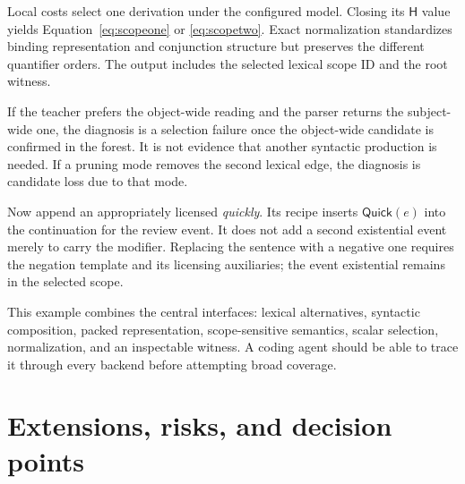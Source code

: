 \documentclass[11pt,a4paper]{article}
\newcommand{\HH}{\mathsf{H}}
\begin{document}
Local costs select one derivation under the configured model. Closing its
\(\HH\) value yields Equation~\eqref{eq:scopeone} or
\eqref{eq:scopetwo}. Exact normalization standardizes binding representation
and conjunction structure but preserves the different quantifier orders.
The output includes the selected lexical scope ID and the root witness.

If the teacher prefers the object-wide reading and the parser returns the
subject-wide one, the diagnosis is a selection failure once the object-wide
candidate is confirmed in the forest. It is not evidence that another
syntactic production is needed. If a pruning mode removes the second lexical
edge, the diagnosis is candidate loss due to that mode.

Now append an appropriately licensed \emph{quickly}. Its recipe inserts
\(\mathsf{Quick}(e)\) into the continuation for the review event. It does
not add a second existential event merely to carry the modifier. Replacing
the sentence with a negative one requires the negation template and its
licensing auxiliaries; the event existential remains in the selected scope.

This example combines the central interfaces: lexical alternatives,
syntactic composition, packed representation, scope-sensitive semantics,
scalar selection, normalization, and an inspectable witness. A coding agent
should be able to trace it through every backend before attempting broad
coverage.

\section{Extensions, risks, and decision points}\label{sec:extensions}
\end{document}
